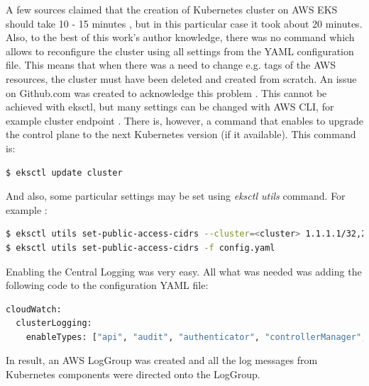A few sources claimed that the creation of Kubernetes cluster on AWS EKS should take 10 - 15 minutes \cite{eks-blog-part1} \cite{eks-blog2}, but in this particular case it took about 20 minutes. Also, to the best of this work’s author knowledge, there was no command which allows to reconfigure the cluster using all settings from the YAML configuration file. This means that when there was a need to change e.g. tags of the AWS resources, the cluster must have been deleted and created from scratch. An issue on Github.com was created to acknowledge this problem \cite{eksctl-no-config-update}. This cannot be achieved with eksctl, but many settings can be changed with AWS CLI, for example cluster endpoint \cite{eks-cluster-endpoint}. There is, however, a command that enables to upgrade the control plane to the next Kubernetes version (if it available). This command is:
\begin{lstlisting}[basicstyle=\tiny,caption={Updating eksctl cluster},captionpos=b,language=Bash,xleftmargin=1cm]
$ eksctl update cluster
\end{lstlisting}
And also, some particular settings may be set using \textit{eksctl utils} command. For example \cite{eksctl-net}:
\begin{lstlisting}[basicstyle=\tiny,caption={Updating eksctl cluster configuration},captionpos=b,language=Bash,xleftmargin=1cm]
$ eksctl utils set-public-access-cidrs --cluster=<cluster> 1.1.1.1/32,2.2.2.0/24
$ eksctl utils set-public-access-cidrs -f config.yaml
\end{lstlisting}


Enabling the Central Logging was very easy. All what was needed was adding the following code to the configuration YAML file:
\begin{lstlisting}[basicstyle=\tiny,caption={Enabling logging in eksctl cluster},captionpos=b,language=Bash,xleftmargin=1cm]
cloudWatch:
  clusterLogging:
    enableTypes: ["api", "audit", "authenticator", "controllerManager", "scheduler"]
\end{lstlisting}

In result, an AWS LogGroup was created and all the log messages from Kubernetes components were directed onto the LogGroup.

